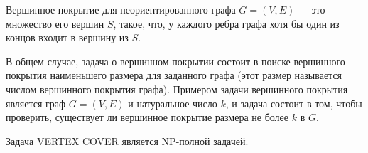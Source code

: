     \begin{Def}
        Вершинное покрытие для неориентированного графа $G=(V,E)$ --- это множество его вершин $S$, такое, что, у каждого ребра графа хотя бы один из концов входит в вершину из $S$.
    \end{Def}
    \begin{Def}
        В общем случае, задача о вершинном покрытии состоит в поиске вершинного покрытия наименьшего размера для заданного графа (этот размер называется числом вершинного покрытия графа). Примером задачи вершинного покрытия является граф $G=(V, E)$ и натуральное число $k$, и задача состоит в том, чтобы проверить, существует ли вершинное покрытие размера не более $k$ в $G$.
    \end{Def}
    \begin{Thm}
        Задача VERTEX COVER является NP-полной задачей.
    \end{Thm}
